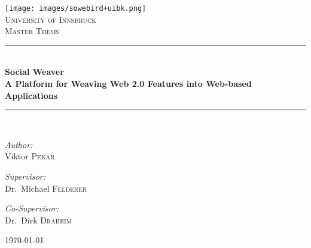 \documentclass[12pt, twoside]{article}
\newcommand{\HRule}{\rule{\linewidth}{0.5mm}}
\begin{document}
\begin{titlepage}
\begin{center}


\texttt{[image: images/sowebird+uibk.png]}~\\[1cm]

\textsc{\LARGE University of Innsbruck}\\[1.5cm]

\textsc{\Large Master Thesis}\\[0.5cm]

\HRule\\[0.4cm]
{ \huge \bfseries Social Weaver\\[0.2cm]
\large A Platform for Weaving Web 2.0 Features into Web-based Applications}\\[0.4cm]

\HRule \\[1.5cm]

\begin{minipage}{0.4\textwidth}
\begin{flushleft} \large
\emph{Author:}\\
Viktor \textsc{Pekar}
\end{flushleft}
\end{minipage}
\begin{minipage}{0.4\textwidth}
\begin{flushright} \large
\emph{Supervisor:} \\
Dr.~Michael \textsc{Felderer}
\end{flushright}
\begin{flushright} \large
\emph{Co-Supervisor:} \\
Dr.~Dirk \textsc{Draheim}
\end{flushright}
\end{minipage}

\vfill

{\large \today}

\end{center}
\end{titlepage}

\newpage
\tableofcontents
\newpage
\listoffigures
\newpage


\newpage

\newpage

\newpage

\newpage

\newpage

\newpage

\newpage

\newpage


\begin{appendices}

\end{appendices}

\newpage


\nocite{*}
\end{document}
